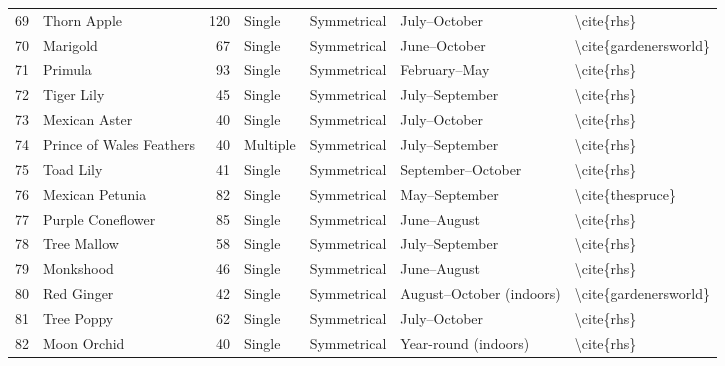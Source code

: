 \begin{table}
\begin{tabular}{rlrllll}
    69 &               Thorn Apple &          120 &      Single &  Symmetrical &             July–October &              \textbackslash cite\{rhs\} \\
    70 &                  Marigold &           67 &      Single &  Symmetrical &             June–October &   \textbackslash cite\{gardenersworld\} \\
    71 &                   Primula &           93 &      Single &  Symmetrical &             February–May &              \textbackslash cite\{rhs\} \\
    72 &                Tiger Lily &           45 &      Single &  Symmetrical &           July–September &              \textbackslash cite\{rhs\} \\
    73 &             Mexican Aster &           40 &      Single &  Symmetrical &             July–October &              \textbackslash cite\{rhs\} \\
    74 &  Prince of Wales Feathers &           40 &    Multiple &  Symmetrical &           July–September &              \textbackslash cite\{rhs\} \\
    75 &                 Toad Lily &           41 &      Single &  Symmetrical &        September–October &              \textbackslash cite\{rhs\} \\
    76 &           Mexican Petunia &           82 &      Single &  Symmetrical &            May–September &        \textbackslash cite\{thespruce\} \\
    77 &         Purple Coneflower &           85 &      Single &  Symmetrical &              June–August &              \textbackslash cite\{rhs\} \\
    78 &               Tree Mallow &           58 &      Single &  Symmetrical &           July–September &              \textbackslash cite\{rhs\} \\
    79 &                 Monkshood &           46 &      Single &  Symmetrical &              June–August &              \textbackslash cite\{rhs\} \\
    80 &                Red Ginger &           42 &      Single &  Symmetrical & August–October (indoors) &   \textbackslash cite\{gardenersworld\} \\
    81 &                Tree Poppy &           62 &      Single &  Symmetrical &             July–October &              \textbackslash cite\{rhs\} \\
    82 &               Moon Orchid &           40 &      Single &  Symmetrical &     Year-round (indoors) &              \textbackslash cite\{rhs\} \\

\end{tabular}
\end{table}
